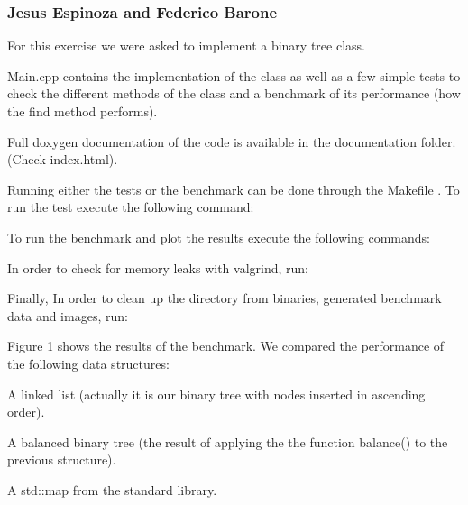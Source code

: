 \subsubsection*{Jesus Espinoza and Federico Barone}

\DoxyHorRuler


For this exercise we were asked to implement a binary tree class.

{\ttfamily Main.\+cpp} contains the implementation of the class as well as a few simple tests to check the different methods of the class and a benchmark of its performance (how the find method performs).

Full {\ttfamily doxygen} documentation of the code is available in the documentation folder. (Check {\ttfamily index.\+html}).

Running either the tests or the benchmark can be done through the {\ttfamily Makefile} . To run the test execute the following command\+:


\begin{DoxyCode}{0}
\end{DoxyCode}


To run the benchmark and plot the results execute the following commands\+:


\begin{DoxyCode}{0}
\end{DoxyCode}


In order to check for memory leaks with {\ttfamily valgrind}, run\+:


\begin{DoxyCode}{0}
\end{DoxyCode}


Finally, In order to clean up the directory from binaries, generated benchmark data and images, run\+:


\begin{DoxyCode}{0}
\end{DoxyCode}


Figure 1 shows the results of the benchmark. We compared the performance of the following data structures\+:


\begin{DoxyItemize}
\item A linked list (actually it is our binary tree with nodes inserted in ascending order).
\item A balanced binary tree (the result of applying the the function {\ttfamily balance()} to the previous structure).
\item A std\+::map from the standard library.
\end{DoxyItemize}

